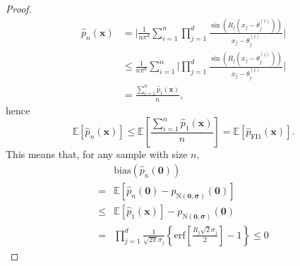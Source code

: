 \documentclass[%
 reprint,
 amsmath,amssymb,
 aps,
]{revtex4-2}
\def\E{\mathbb{E}}
\def\erf{\text{erf}}
\begin{document}
\begin{proof}
\begin{align*}
    \hat{p}_{n}(\mathbf{x}) & = \bigg|\frac{1}{n\pi^d}\sum_{i = 1}^n \prod_{j = 1}^d \frac{\sin(R_j(x_j - \theta_j^{(i)}))}{x_j - \theta_j^{(i)}}\bigg| \\
    & \le \frac{1}{n\pi^d}\sum_{i = 1}^n \bigg|\prod_{j = 1}^d \frac{\sin(R_j(x_j - \theta_j^{(i)}))}{x_j - \theta_j^{(i)}}\bigg|\\
    & = \frac{\sum_{i=1}^n\hat{p}_{\text{1}}(\mathbf{x})}{n},
    \end{align*}
    hence 
    $$
    \E[\hat{p}_{n}(\mathbf{x})] \le \E\left[\frac{\sum_{i=1}^n\hat{p}_{\text{1}}(\mathbf{x})}{n}\right] = \E[\hat{p}_{\text{FI}1}(\mathbf{x})].
    $$
    This means that, for any sample with size $n$,
    \begin{align*}
        & \text{bias}(\hat{p}_n(\mathbf{0})) \\
        = & \E[\hat{p}_{n}(\mathbf{0}) - p_{\text{N}(\mathbf{0}, \boldsymbol{\sigma})}(\mathbf{0})] \\
        \le & \E[\hat{p}_{\text{1}}(\mathbf{x})] - p_{\text{N}(\mathbf{0}, \boldsymbol{\sigma})}(\mathbf{0})\\
        = & \prod_{j=1}^d \frac{1}{\sqrt{2\pi}\sigma_j}\left\{\erf\left[\frac{R_j \sqrt{2}\sigma_j}{2} \right]-1 \right\} \le 0
    \end{align*}
\end{proof}



\end{document}
